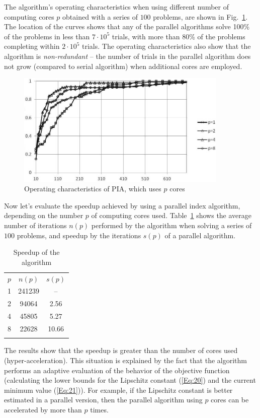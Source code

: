 \documentclass{llncs}
\begin{document}
The algorithm's operating characteristics when using different number of computing cores $p$ obtained with a series of $100$ problems, are shown in Fig.~\ref{fig:fig8}. The location of the curves shows that any of the parallel algorithms solve 100\% of the problems in less than $7 \cdot 10^5$ trials, with more than 80\% of the problems completing within $2 \cdot 10^5$  trials. The operating characteristics also show that the algorithm is \textit{non-redundant} -- the number of trials in the parallel algorithm does not grow (compared to serial algorithm) when additional cores are employed. 
\begin{figure}[h]
\begin{center}
  \includegraphics[width=0.9\textwidth]{fig8.jpg} 
  \caption{Operating characteristics of PIA, which uses $p$ cores }\label{fig:fig8} 
\end{center}
\end{figure}

Now let's evaluate the speedup achieved by using a parallel index algorithm, depending on the number $p$ of computing cores used. Table~\ref{tab:comparison} shows the average number of iterations $n(p)$ performed by the algorithm when solving a series of $100$ problems, and speedup by the iterations $s(p)$ of a parallel algorithm. 
\begin{table}
	\caption{Speedup of the algorithm}
	\label{tab:comparison}
	\center
	\begin{tabular}{ccc}
		\hline\noalign{\smallskip}
	   $p$ & $n(p)$ & $s(p)$  \\
	  \noalign{\smallskip} \hline \noalign{\smallskip}		
	   1 &	241239 &	-- \\
		 2 &	94064 &	2.56 \\
		 4 &	45805 &	5.27 \\
		 8 &	22628 &	10.66 \\
		\noalign{\smallskip}\hline
	\end{tabular}
\end{table}
The results show that the speedup is greater than the number of cores used (hyper-acceleration). This situation is explained by the fact that the algorithm performs an adaptive evaluation of the behavior of the objective function (calculating the lower bounds for the Lipschitz constant (\ref{Eq:20}) and the current minimum value (\ref{Eq:21})). For example, if the Lipschitz constant is better estimated in a parallel version, then the parallel algorithm using $p$ cores can be accelerated by more than $p$ times. 
\end{document}
